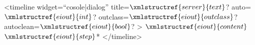 <timeline widget=``cosole|dialog'' title=$\xmlstructref{server}{text}$? auto=$\xmlstructref{eiout}{int}$? outclass=$\xmlstructref{eiout}{outclass}$? autoclean=$\xmlstructref{eiout}{bool}$? > 
  $\xmlstructref{eiout}{content}$
  $\xmlstructref{eiout}{step}$*
</timeline>
